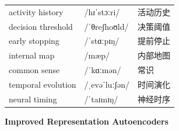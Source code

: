 \documentclass[UTF8,12pt,a4paper]{ctexart}
\providecommand{\zh}[1]{#1}
\begin{document}
\begin{tabular*}{\textwidth}{@{\extracolsep{\fill}}lll@{}}
activity history & {\ipafont /hɪˈstɔːri/} & \zh{活动历史} \\
decision threshold & {\ipafont /ˈθreʃhoʊld/} & \zh{决策阈值} \\
early stopping & {\ipafont /ˈstɑːpɪŋ/} & \zh{提前停止} \\
internal map & {\ipafont /mæp/} & \zh{内部地图} \\
common sense & {\ipafont /ˈkɑːmən/} & \zh{常识} \\
temporal evolution & {\ipafont /ˌevəˈluːʃən/} & \zh{时间演化} \\
neural timing & {\ipafont /ˈtaɪmɪŋ/} & \zh{神经时序} \\
\bottomrule
\end{tabular*}

\newpage

\begin{center}
    {\Large\bfseries Improved Representation Autoencoders}
\end{center}
\end{document}
